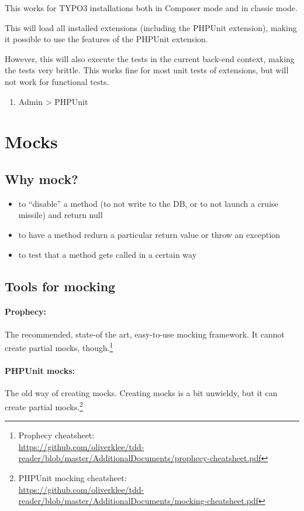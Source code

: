 \documentclass[a4paper,11pt,headsepline]{scrartcl}
\begin{document}
This works for TYPO3 installations both in Composer mode and in classic mode.

This will load all installed extensions (including the PHPUnit extension), making it possible to use the features of the PHPUnit extension.

However, this will also execute the tests in the current back-end context, making the tests very brittle. This works fine for most unit tests of extensions, but will not work for functional tests.

\begin{enumerate}
  \item Admin > PHPUnit
\end{enumerate}



\pagebreak
\section{Mocks}

\subsection{Why mock?}
\begin{itemize}
  \item to ``disable'' a method (to not write to the DB, or to not launch a cruise missile) and return null
  \item to have a method redurn a particular return value or throw an exception
  \item to test that a method gets called in a certain way
\end{itemize}

\subsection{Tools for mocking}

\paragraph{Prophecy:} The recommended, state-of the art, easy-to-use mocking framework. It cannot create partial mocks, though.\footnote{Prophecy cheatsheet:\\ \url{https://github.com/oliverklee/tdd-reader/blob/master/AdditionalDocuments/prophecy-cheatsheet.pdf}}
\paragraph{PHPUnit mocks:} The old way of creating mocks. Creating mocks is a bit unwieldy, but it can create partial mocks.\footnote{PHPUnit mocking cheatsheet:\\ \url{https://github.com/oliverklee/tdd-reader/blob/master/AdditionalDocuments/mocking-cheatsheet.pdf}}
\end{document}
